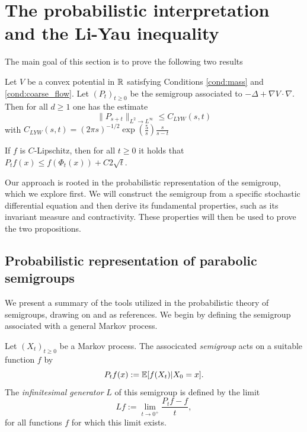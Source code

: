 \section{The probabilistic interpretation and the Li-Yau inequality}

The main goal of this section is to prove the following two results 

\begin{proposition} \label{prop:ultracon_app}
Let $V$ be a convex potential in $\mathbb{R}$ satisfying Conditions \ref{cond:mass} and \ref{cond:coarse_flow}. Let $(P_t)_{t \ge 0}$ be the semigroup associated to $-\Delta + \nabla V \cdot \nabla$. Then for all $d\ge 1$ one has the estimate
$$
\|P_{s+t}\|_{L^2\to L^\infty} \le C_{LYW}(s,t)
$$
with $C_{LYW}(s,t) = (2 \pi s)^{-1/2}  \exp(\frac{5}{s})\frac{s}{s-t}$
\end{proposition}

\begin{proposition} \label{prop:approx_by_flow}
    If \( f \) is \( C \)-Lipschitz, then for all \( t \ge 0 \) it holds that $P_t f (x) \le f(\Phi_t(x)) + C 2\sqrt{t}$.
\end{proposition}

Our approach is rooted in the probabilistic representation of the semigroup, which we explore first. We will construct the semigroup from a specific stochastic differential equation and then derive its fundamental properties, such as its invariant measure and contractivity. These properties will then be used to prove the two propositions.


\subsection{Probabilistic representation of parabolic semigroups} \label{sec:probabilistic}

We present a summary of the tools utilized in the probabilistic theory of semigroups, drawing on \cite{bakry_analysis_2014} and \cite{chen_lecture_2025} as references. We begin by defining the semigroup associated with a general Markov process.

\begin{definition}
    Let $(X_t)_{t\ge 0}$ be a Markov process. The associcated \emph{semigroup} acts on a suitable function $f$ by
    $$
    P_t f(x) := \mathbb{E}[f(X_t) | X_0 = x ].
    $$
    The \emph{infinitesimal generator} $L$ of this semigroup is defined by the limit
    $$ 
    Lf := \lim_{t \to 0^+} \frac{P_t f - f}{t}, 
    $$
    for all functions $f$ for which this limit exists.
\end{definition}


